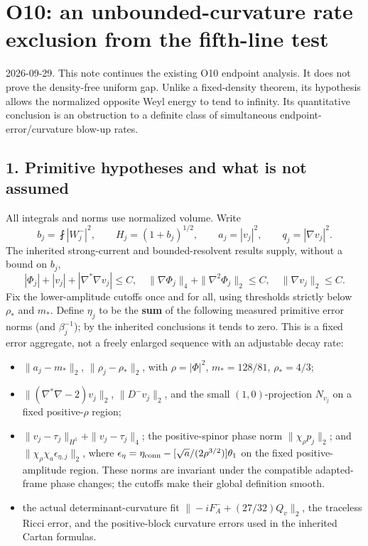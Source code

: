 \documentclass[
]{article}
\author{}
\date{}
\providecommand{\tightlist}{%
  \setlength{\itemsep}{0pt}\setlength{\parskip}{0pt}}
\begin{document}
\hypertarget{o10-an-unbounded-curvature-rate-exclusion-from-the-fifth-line-test}{%
\section{O10: an unbounded-curvature rate exclusion from the fifth-line
test}\label{o10-an-unbounded-curvature-rate-exclusion-from-the-fifth-line-test}}

2026-09-29. This note continues the existing O10 endpoint analysis. It
does not prove the density-free uniform gap. Unlike a fixed-density
theorem, its hypothesis allows the normalized opposite Weyl energy to
tend to infinity. Its quantitative conclusion is an obstruction to a
definite class of simultaneous endpoint-error/curvature blow-up rates.

\hypertarget{primitive-hypotheses-and-what-is-not-assumed}{%
\subsection{1. Primitive hypotheses and what is not
assumed}\label{primitive-hypotheses-and-what-is-not-assumed}}

All integrals and norms use normalized volume. Write \[
 b_j=\fint|W^-_j|^2,\qquad H_j=(1+b_j)^{1/2},\qquad a_j=|v_j|^2,\qquad q_j=|\nabla v_j|^2.
\] The inherited strong-current and bounded-resolvent results supply,
without a bound on \(b_j\), \[
 |\Phi_j|+|v_j|+|\nabla^*\nabla v_j|\le C,
 \quad \|\nabla\Phi_j\|_4+\|\nabla^2\Phi_j\|_2\le C,
 \quad \|\nabla v_j\|_2\le C.
\] Fix the lower-amplitude cutoffs once and for all, using thresholds
strictly below \(\rho_*\) and \(m_*\). Define \(\eta_j\) to be the
\textbf{sum} of the following measured primitive error norms (and
\(\beta_j^{-1}\)); by the inherited conclusions it tends to zero. This
is a fixed error aggregate, not a freely enlarged sequence with an
adjustable decay rate:

\begin{itemize}
\tightlist
\item
  \(\|a_j-m_*\|_2\), \(\|\rho_j-\rho_*\|_2\), with \(\rho=|\Phi|^2\),
  \(m_*=128/81\), \(\rho_*=4/3\);
\item
  \(\|(\nabla^*\nabla-2)v_j\|_2\), \(\|D^-v_j\|_2\), and the small
  \((1,0)\)-projection \(N_{v_j}\) on a fixed positive-\(\rho\) region;
\item
  \(\|v_j-\tau_j\|_{H^1}+\|v_j-\tau_j\|_4\); the positive-spinor phase
  norm \(\|\chi_\rho p_j\|_2\); and
  \(\|\chi_\rho\chi_a\epsilon_{\eta,j}\|_2\), where
  \(\epsilon_\eta=\eta_{\rm conn}-[\sqrt a/(2\rho^{3/2})]\theta_1\) on
  the fixed positive-amplitude region. These norms are invariant under
  the compatible adapted-frame phase changes; the cutoffs make their
  global definition smooth.
\item
  the actual determinant-curvature fit \(\| -iF_A^-+(27/32)Q_v\|_2\),
  the traceless Ricci error, and the positive-block curvature errors
  used in the inherited Cartan formulas.
\end{itemize}
\end{document}
